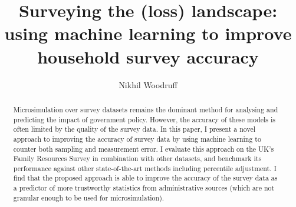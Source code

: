 \documentclass[twocolumn]{article}
\begin{document}
%
\title{Surveying the (loss) landscape: using machine learning to improve household survey accuracy}


\author{Nikhil Woodruff}





\maketitle

\begin{abstract}
  Microsimulation over survey datasets remains the dominant method for analysing and predicting the impact of government policy. However, the accuracy of these models is often limited by the quality of the survey data. In this paper, I present a novel approach to improving the accuracy of survey data by using machine learning to counter both sampling and measurement error. I evaluate this approach on the UK's Family Resources Survey in combination with other datasets, and benchmark its performance against other state-of-the-art methods including percentile adjustment. I find that the proposed approach is able to improve the accuracy of the survey data as a predictor of more trustworthy statistics from administrative sources (which are not granular enough to be used for microsimulation).
\end{abstract}
\end{document}
